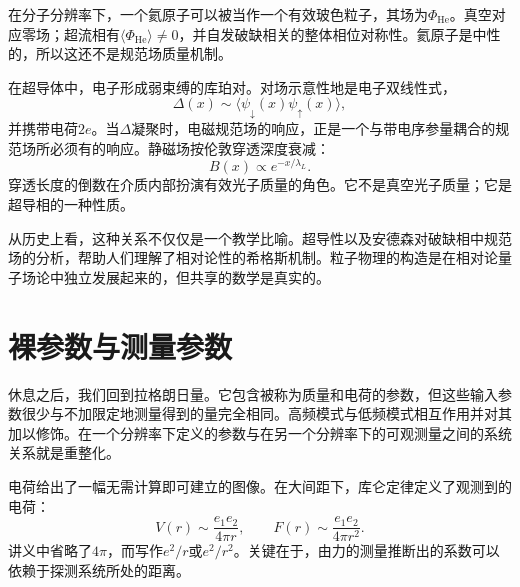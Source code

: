 在分子分辨率下，一个氦原子可以被当作一个有效玻色粒子，其场为\(\Phi_{\mathrm{He}}\)。真空对应零场；超流相有\(\langle\Phi_{\mathrm{He}}\rangle\ne0\)，并自发破缺相关的整体相位对称性。氦原子是中性的，所以这还不是规范场质量机制。

在超导体中，电子形成弱束缚的库珀对。对场示意性地是电子双线性式，
\begin{equation}
  \Delta(x)\sim\langle\psi_\downarrow(x)\psi_\uparrow(x)\rangle,
  \label{eq:l10-cooper-order-parameter}
\end{equation}
并携带电荷\(2e\)。当\(\Delta\)凝聚时，电磁规范场的响应，正是一个与带电序参量耦合的规范场所必须有的响应。静磁场按伦敦穿透深度衰减：
\begin{equation}
  B(x)\propto e^{-x/\lambda_L}.
  \label{eq:l10-meissner-screening}
\end{equation}
穿透长度的倒数在介质内部扮演有效光子质量的角色。它不是真空光子质量；它是超导相的一种性质。

\begin{classroomqa}
\end{classroomqa}

从历史上看，这种关系不仅仅是一个教学比喻。超导性以及安德森对破缺相中规范场的分析，帮助人们理解了相对论性的希格斯机制。粒子物理的构造是在相对论量子场论中独立发展起来的，但共享的数学是真实的。

\section{裸参数与测量参数}

休息之后，我们回到拉格朗日量。它包含被称为质量和电荷的参数，但这些输入参数很少与不加限定地测量得到的量完全相同。高频模式与低频模式相互作用并对其加以修饰。在一个分辨率下定义的参数与在另一个分辨率下的可观测量之间的系统关系就是重整化。

电荷给出了一幅无需计算即可建立的图像。在大间距下，库仑定律定义了观测到的电荷：
\begin{equation}
  V(r)\sim\frac{e_1e_2}{4\pi r},
  \qquad
  F(r)\sim\frac{e_1e_2}{4\pi r^2}.
  \label{eq:l10-coulomb-law}
\end{equation}
讲义中省略了\(4\pi\)，而写作\(e^2/r\)或\(e^2/r^2\)。关键在于，由力的测量推断出的系数可以依赖于探测系统所处的距离。


